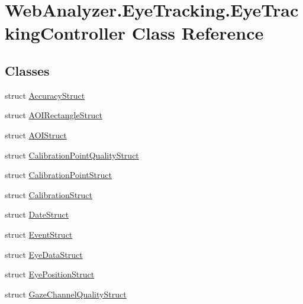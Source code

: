 \hypertarget{class_web_analyzer_1_1_eye_tracking_1_1_eye_tracking_controller}{}\section{Web\+Analyzer.\+Eye\+Tracking.\+Eye\+Tracking\+Controller Class Reference}
\label{class_web_analyzer_1_1_eye_tracking_1_1_eye_tracking_controller}
\subsection*{Classes}
\begin{DoxyCompactItemize}
\item 
struct \hyperlink{struct_web_analyzer_1_1_eye_tracking_1_1_eye_tracking_controller_1_1_accuracy_struct}{Accuracy\+Struct}
\item 
struct \hyperlink{struct_web_analyzer_1_1_eye_tracking_1_1_eye_tracking_controller_1_1_a_o_i_rectangle_struct}{A\+O\+I\+Rectangle\+Struct}
\item 
struct \hyperlink{struct_web_analyzer_1_1_eye_tracking_1_1_eye_tracking_controller_1_1_a_o_i_struct}{A\+O\+I\+Struct}
\item 
struct \hyperlink{struct_web_analyzer_1_1_eye_tracking_1_1_eye_tracking_controller_1_1_calibration_point_quality_struct}{Calibration\+Point\+Quality\+Struct}
\item 
struct \hyperlink{struct_web_analyzer_1_1_eye_tracking_1_1_eye_tracking_controller_1_1_calibration_point_struct}{Calibration\+Point\+Struct}
\item 
struct \hyperlink{struct_web_analyzer_1_1_eye_tracking_1_1_eye_tracking_controller_1_1_calibration_struct}{Calibration\+Struct}
\item 
struct \hyperlink{struct_web_analyzer_1_1_eye_tracking_1_1_eye_tracking_controller_1_1_date_struct}{Date\+Struct}
\item 
struct \hyperlink{struct_web_analyzer_1_1_eye_tracking_1_1_eye_tracking_controller_1_1_event_struct}{Event\+Struct}
\item 
struct \hyperlink{struct_web_analyzer_1_1_eye_tracking_1_1_eye_tracking_controller_1_1_eye_data_struct}{Eye\+Data\+Struct}
\item 
struct \hyperlink{struct_web_analyzer_1_1_eye_tracking_1_1_eye_tracking_controller_1_1_eye_position_struct}{Eye\+Position\+Struct}
\item 
struct \hyperlink{struct_web_analyzer_1_1_eye_tracking_1_1_eye_tracking_controller_1_1_gaze_channel_quality_struct}{Gaze\+Channel\+Quality\+Struct}

\end{DoxyCompactItemize}

